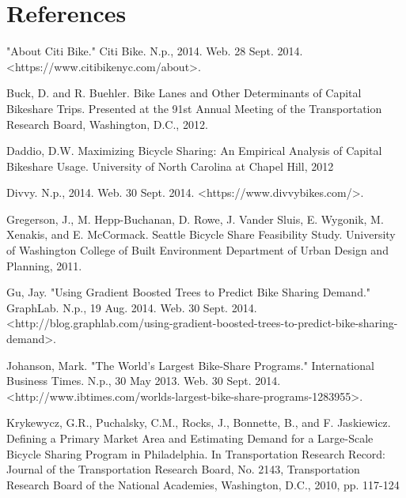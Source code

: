 \documentclass{sig-alternate}
\begin{document}
\section{References}
\label{sec:references}
\begin{enumerate*}
\item "About Citi Bike." Citi Bike. N.p., 2014. Web. 28 Sept. 2014. <https://www.citibikenyc.com/about>. \newline

\item Buck, D. and R. Buehler. Bike Lanes and Other Determinants of Capital Bikeshare Trips. Presented at the 91st
Annual Meeting of the Transportation Research Board, Washington,  D.C., 2012. \newline

\item Daddio, D.W. Maximizing Bicycle Sharing: An Empirical Analysis of Capital Bikeshare Usage. University of North Carolina at Chapel Hill, 2012 \newline

\item Divvy. N.p., 2014. Web. 30 Sept. 2014. \newline<https://www.divvybikes.com/>. \newline

\item Gregerson, J., M. Hepp-Buchanan, D. Rowe, J. Vander Sluis, E. Wygonik, M. Xenakis, and E. McCormack. Seattle Bicycle Share Feasibility Study. University of Washington College of Built Environment Department of Urban Design and Planning, 2011. \newline

\item Gu, Jay. "Using Gradient Boosted Trees to Predict Bike Sharing Demand." GraphLab. N.p., 19 Aug. 2014. Web. 30 Sept. 2014. <http://blog.graphlab.com/using-gradient-boosted-trees-to-predict-bike-sharing-demand>. \newline

\item Johanson, Mark. "The World's Largest Bike-Share Programs." International Business Times. N.p., 30 May 2013. Web. 30 Sept. 2014. \newline<http://www.ibtimes.com/worlds-largest-bike-\newline share-programs-1283955>. \newline

\item Krykewycz, G.R., Puchalsky, C.M., Rocks, J., Bonnette, B., and F. Jaskiewicz. Defining a Primary Market Area and Estimating Demand for a Large-Scale Bicycle Sharing Program in  Philadelphia. In Transportation Research Record: Journal of the Transportation Research  Board, No. 2143, Transportation Research Board of the National Academies, Washington,  D.C., 2010, pp. 117-124 \newline


\end{enumerate*}
\end{document}
